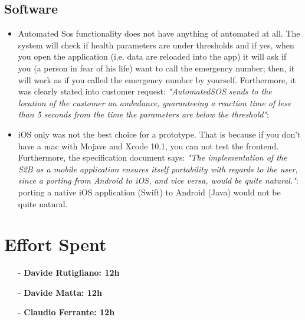 \documentclass[a4paper]{article}
\begin{document}
\subsection{Software}
\begin{itemize}
    \item Automated Sos functionality does not have anything of automated at all. The system will check if health parameters are under thresholds and if yes, when you open the application (i.e. data are reloaded into the app) it will ask if you (a person in fear of his life) want to call the emergency number; then, it will work as if you called the emergency number by yourself. Furthermore, it was clearly stated into customer request: \textit{"AutomatedSOS sends to the location of the customer an ambulance, guaranteeing a reaction time of less than 5 seconds from the time the parameters are below the threshold"};
    
    \item iOS only was not the best choice for a prototype. That is because if you don't have a mac with Mojave and Xcode 10.1, you can not test the frontend. Furthermore, the specification document says: \textit{"The implementation of the S2B as a mobile application ensures itself portability with regards to the user, since a porting from Android to iOS, and vice versa, would be quite natural."}: porting a native iOS application (Swift) to Android (Java) would not be quite natural.
\end{itemize}

\newpage
\section{Effort Spent}
    \begin{itemize}
        \item[-] \textbf{Davide Rutigliano: 12h}
        
        \item[-] \textbf{Davide Matta: 12h}
        
        \item[-] \textbf{Claudio Ferrante: 12h}
    \end{itemize}
\end{document}
